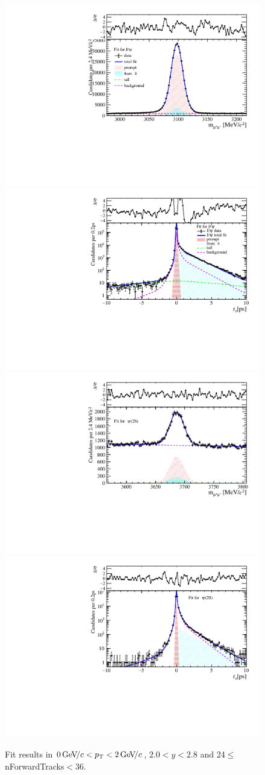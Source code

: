 \begin{figure}[H]
\begin{center}
\includegraphics[width=0.47\linewidth]{pdf/Jpsi/drawmassF/n3y1pt1.pdf}
\includegraphics[width=0.47\linewidth]{pdf/Jpsi/2DFitF/n3y1pt1.pdf}
\vspace*{-0.5cm}
\includegraphics[width=0.47\linewidth]{pdf/Psi2S/drawmassF/n3y1pt1.pdf}
\includegraphics[width=0.47\linewidth]{pdf/Psi2S/2DFitF/n3y1pt1.pdf}
\vspace*{-0.5cm}
\end{center}
\caption{Fit results in $0\text{\,Ge\kern -0.1em V\!/}c<p_{\mathrm{T}}<2\text{\,Ge\kern -0.1em V\!/}c$, $2.0<y<2.8$ and 24$\leq$nForwardTracks$<$36.}
\label{Fitn3y1pt1}
\end{figure}
